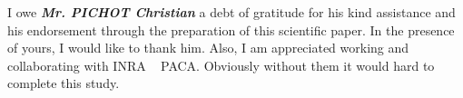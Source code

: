 
\begin{acknowledgements}      


	I owe \textbf{\textit{Mr. PICHOT Christian}} a debt of gratitude for his kind assistance and his endorsement through the preparation of this scientific paper. 
	In the presence of yours, I would like to thank him. Also, I am appreciated working and collaborating with  INRA ~\cite{inra-paca:2019} PACA. Obviously without them it would hard to complete this study.


\end{acknowledgements}
